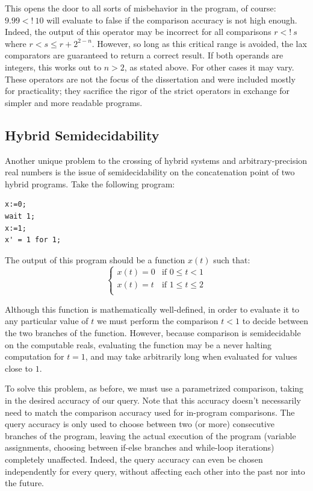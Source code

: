 This opens the door to all sorts of misbehavior in the program, of course: $9.99 <!\ 10$ will evaluate to false if the comparison accuracy is not high enough. Indeed, the output of this operator may be incorrect for all comparisons $r <!\ s$ where $r < s \leq r + 2^{2-n}$. However, so long as this critical range is avoided, the lax comparators are guaranteed to return a correct result. If both operands are integers, this works out to $n>2$, as stated above. For other cases it may vary. These operators are not the focus of the dissertation and were included mostly for practicality; they sacrifice the rigor of the strict operators in exchange for simpler and more readable programs.


\subsection{Hybrid Semidecidability}
\label{sec:hybrid_semidecidability}

Another unique problem to the crossing of hybrid systems and arbitrary-precision real numbers is the issue of semidecidability on the concatenation point of two hybrid programs. Take the following program:

\begin{lstlisting}
x:=0;
wait 1;
x:=1;
x' = 1 for 1;
\end{lstlisting}

The output of this program should be a function $x(t)$ such that:
\begin{equation}
\label{eq:output_example}
  \begin{cases}
    x(t) = 0 & \text{if } 0 \leq t < 1 \\
    x(t) = t & \text{if } 1 \leq t \leq 2 \\
  \end{cases}
\end{equation}

Although this function is mathematically well-defined, in order to evaluate it to any particular value of $t$ we must perform the comparison $t < 1$ to decide between the two branches of the function. However, because comparison is semidecidable on the computable reals, evaluating the function may be a never halting computation for $t=1$, and may take arbitrarily long when evaluated for values close to $1$.

To solve this problem, as before, we must use a parametrized comparison, taking in the desired accuracy of our query. Note that this accuracy doesn't necessarily need to match the comparison accuracy used for in-program comparisons. The query accuracy is only used to choose between two (or more) consecutive branches of the program, leaving the actual execution of the program (variable assignments, choosing between if-else branches and while-loop iterations) completely unaffected. Indeed, the query accuracy can even be chosen independently for every query, without affecting each other into the past nor into the future.

